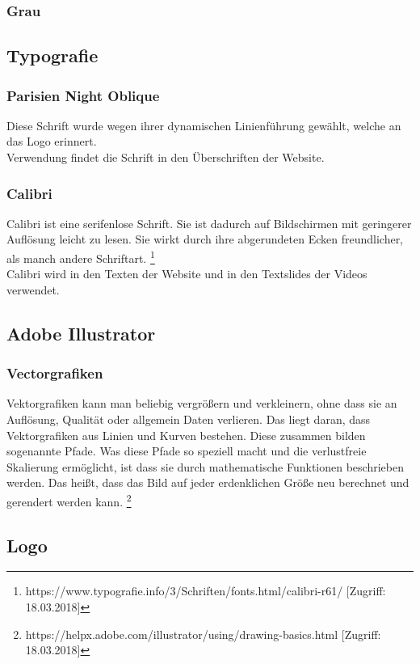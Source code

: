 \subsubsection{Grau}
\subsection{Typografie}
\subsubsection{Parisien Night Oblique}
Diese Schrift wurde wegen ihrer dynamischen Linienführung gewählt, welche an das Logo erinnert.
\\
Verwendung findet die Schrift in den Überschriften der Website.

\subsubsection{Calibri}
Calibri ist eine serifenlose Schrift. Sie ist dadurch auf Bildschirmen mit geringerer Auflösung leicht zu lesen. Sie wirkt durch ihre abgerundeten Ecken freundlicher, als manch andere Schriftart. \footnote{\label{foot:2} https://www.typografie.info/3/Schriften/fonts.html/calibri-r61/ [Zugriff: 18.03.2018]}
\\
Calibri wird in den Texten der Website und in den Textslides der Videos verwendet.

\subsection{Adobe Illustrator}
\subsubsection{Vectorgrafiken}
Vektorgrafiken kann man beliebig vergrößern und verkleinern, ohne dass sie an Auflösung, Qualität oder allgemein Daten verlieren. Das liegt daran, dass Vektorgrafiken aus Linien und Kurven bestehen. Diese zusammen bilden sogenannte Pfade. Was diese Pfade so speziell macht und die verlustfreie Skalierung ermöglicht, ist dass sie durch mathematische Funktionen beschrieben werden. Das heißt, dass das Bild auf jeder erdenklichen Größe neu berechnet und gerendert werden kann.
\footnote{\label{foot:1} https://helpx.adobe.com/illustrator/using/drawing-basics.html [Zugriff: 18.03.2018]}

\subsection{Logo}
